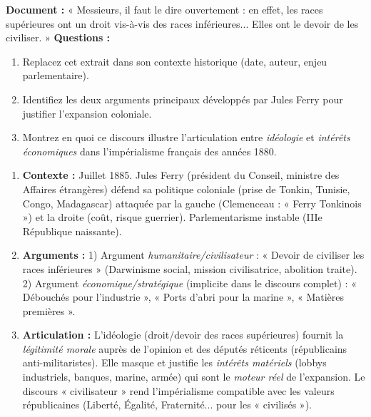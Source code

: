 \documentclass[11pt]{article}
\begin{document}
\begin{exercice}
\textbf{Document :} « Messieurs, il faut le dire ouvertement : en effet, les races supérieures ont un droit vis-à-vis des races inférieures... Elles ont le devoir de les civiliser. »
\textbf{Questions :}
\begin{enumerate}
    \item Replacez cet extrait dans son contexte historique (date, auteur, enjeu parlementaire).
    \item Identifiez les deux arguments principaux développés par Jules Ferry pour justifier l'expansion coloniale.
    \item Montrez en quoi ce discours illustre l'articulation entre \emph{idéologie} et \emph{intérêts économiques} dans l'impérialisme français des années 1880.
\end{enumerate}
\end{exercice}

\begin{corrige}[Exercice n°1]
\begin{enumerate}
    \item \textbf{Contexte :} Juillet 1885. Jules Ferry (président du Conseil, ministre des Affaires étrangères) défend sa politique coloniale (prise de Tonkin, Tunisie, Congo, Madagascar) attaquée par la gauche (Clemenceau : « Ferry Tonkinois ») et la droite (coût, risque guerrier). Parlementarisme instable (IIIe République naissante).
    \item \textbf{Arguments :} 1) Argument \emph{humanitaire/civilisateur} : « Devoir de civiliser les races inférieures » (Darwinisme social, mission civilisatrice, abolition traite). 2) Argument \emph{économique/stratégique} (implicite dans le discours complet) : « Débouchés pour l'industrie », « Ports d'abri pour la marine », « Matières premières ».
    \item \textbf{Articulation :} L'idéologie (droit/devoir des races supérieures) fournit la \emph{légitimité morale} auprès de l'opinion et des députés réticents (républicains anti-militaristes). Elle masque et justifie les \emph{intérêts matériels} (lobbys industriels, banques, marine, armée) qui sont le \emph{moteur réel} de l'expansion. Le discours « civilisateur » rend l'impérialisme compatible avec les valeurs républicaines (Liberté, Égalité, Fraternité... pour les « civilisés »).
\end{enumerate}
\end{corrige}
\end{document}
